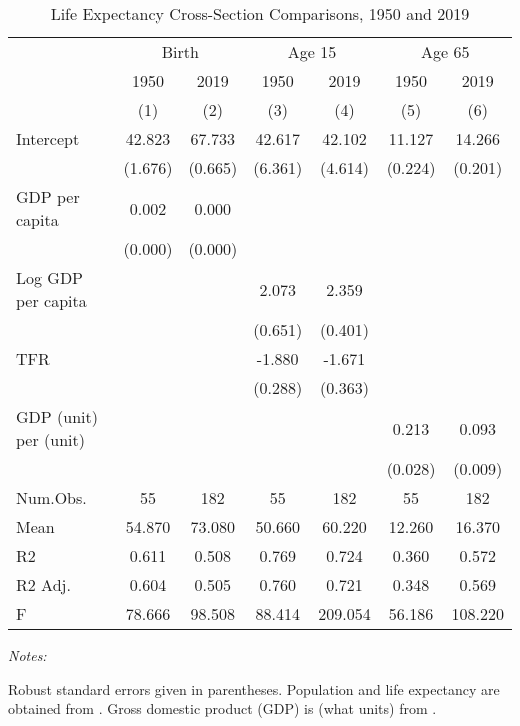 \begin{table}[H]

\caption{Life Expectancy Cross-Section Comparisons, 1950 and 2019 \label{tab:lecrosssection}}
\centering
\begin{threeparttable}
\begin{tabular}[t]{lcccccc}
\toprule
\multicolumn{1}{c}{ } & \multicolumn{2}{c}{Birth} & \multicolumn{2}{c}{Age 15} & \multicolumn{2}{c}{Age 65} \\
\cmidrule(l{3pt}r{3pt}){2-3} \cmidrule(l{3pt}r{3pt}){4-5} \cmidrule(l{3pt}r{3pt}){6-7}
\multicolumn{1}{c}{ } & \multicolumn{1}{c}{1950} & \multicolumn{1}{c}{2019} & \multicolumn{1}{c}{1950} & \multicolumn{1}{c}{2019} & \multicolumn{1}{c}{1950} & \multicolumn{1}{c}{2019} \\
\cmidrule(l{3pt}r{3pt}){2-2} \cmidrule(l{3pt}r{3pt}){3-3} \cmidrule(l{3pt}r{3pt}){4-4} \cmidrule(l{3pt}r{3pt}){5-5} \cmidrule(l{3pt}r{3pt}){6-6} \cmidrule(l{3pt}r{3pt}){7-7}
  & (1) & (2) & (3) & (4) & (5) & (6)\\
\midrule
Intercept & 42.823 & 67.733 & 42.617 & 42.102 & 11.127 & 14.266\\
 & (1.676) & (0.665) & (6.361) & (4.614) & (0.224) & (0.201)\\
GDP per capita & 0.002 & 0.000 &  &  &  & \\
 & (0.000) & (0.000) &  &  &  & \\
Log GDP per capita &  &  & 2.073 & 2.359 &  & \\
 &  &  & (0.651) & (0.401) &  & \\
TFR &  &  & -1.880 & -1.671 &  & \\
 &  &  & (0.288) & (0.363) &  & \\
GDP (unit) per (unit) &  &  &  &  & 0.213 & 0.093\\
 &  &  &  &  & (0.028) & (0.009)\\
\midrule
Num.Obs. & 55 & 182 & 55 & 182 & 55 & 182\\
Mean & 54.870 & 73.080 & 50.660 & 60.220 & 12.260 & 16.370\\
R2 & 0.611 & 0.508 & 0.769 & 0.724 & 0.360 & 0.572\\
R2 Adj. & 0.604 & 0.505 & 0.760 & 0.721 & 0.348 & 0.569\\
F & 78.666 & 98.508 & 88.414 & 209.054 & 56.186 & 108.220\\
\bottomrule
\end{tabular}
\begin{tablenotes}
\item \textit{Notes: } 
\item Robust standard errors given in parentheses. Population and life expectancy are obtained from \citet{undesaWorldPopulationProspects2022}. Gross domestic product (GDP) is (what units) from \citet{feenstraNextGenerationPenn2015}.
\end{tablenotes}
\end{threeparttable}
\end{table}

